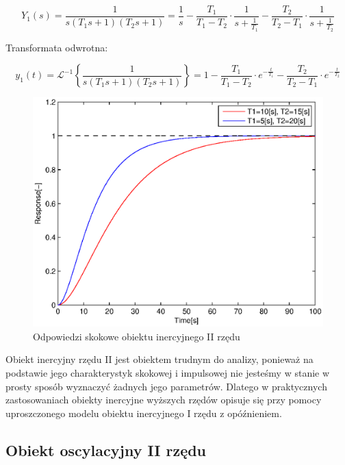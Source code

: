 \documentclass[12pt]{article}
\begin{document}
\begin{equation*}
	Y_{1}(s)=\frac{1}{s(T_1s+1)(T_2s+1)}=
	\frac{1}{s}-
	\frac{T_1}{T_1-T_2}\cdot \frac{1}{s+\frac{1}{T_1}}-
	\frac{T_2}{T_2-T_1}\cdot \frac{1}{s+\frac{1}{T_2}}
\end{equation*}

Transformata odwrotna:

\begin{equation*}
	y_{1}(t)=\mathcal{L}^{-1}\left\{\frac{1}{s(T_1s+1)(T_2s+1)}\right\}=
	1-
	\frac{T_1}{T_1-T_2}\cdot e^{-\frac{t}{T_1}}-
	\frac{T_2}{T_2-T_1}\cdot e^{-\frac{t}{T_2}}
\end{equation*}

\begin{figure}[!htb]
	\begin{center}
		\includegraphics[width=14cm]{../res/img/step2.eps}
	\end{center}
	\caption{Odpowiedzi skokowe obiektu inercyjnego II rzędu}
\end{figure}

Obiekt inercyjny rzędu II jest obiektem trudnym do analizy, ponieważ na
podstawie jego charakterystyk skokowej i impulsowej nie jesteśmy w stanie w
prosty sposób wyznaczyć żadnych jego parametrów. Dlatego w praktycznych
zastosowaniach obiekty inercyjne wyższych rzędów opisuje się przy pomocy
uproszczonego modelu obiektu inercyjnego I rzędu z opóźnieniem.

\newpage

\subsection{Obiekt oscylacyjny II rzędu}
\end{document}
